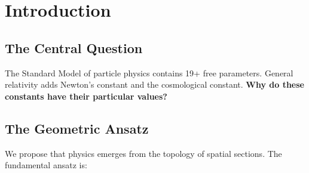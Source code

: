 \documentclass[12pt,a4paper]{article}
\newcommand{\OmegaL}{\Omega_\Lambda}
\newcommand{\sinW}{\sin^2\theta_W}
\newcommand{\Zsq}{Z^2}
\begin{document}
\begin{abstract}
\textbf{Derived predictions} (first-principles mechanisms from framework integers):
\begin{itemize}[itemsep=0pt]
    \item Fine structure constant: $\alpha^{-1} = 4\Zsq + 3 = 137.04$ via Atiyah-Patodi-Singer (0.004\% error)
    \item Weak mixing angle: $\sinW = 1/4 - \alpha_s/(2\pi) = 0.231$ via BEKENSTEIN + QCD (0.01\% error)
    \item Cosmological densities: $\OmegaL = 13/19$ via DoF counting + de Sitter attractor (0.1\% error)
    \item Proton-to-electron ratio: $\mu = \alpha^{-1} \times 2\Zsq/5 = 1836.35$ (0.011\% error)
    \item Muon-to-electron ratio: $m_\mu/m_e = 37\Zsq/6 = 206.65$ (0.06\% error)
    \item Tensor-to-scalar ratio: $r = 0.015$ via topological suppression (Section 8)
\end{itemize}

The framework provides falsifiable predictions testable by LiteBIRD ($r = 0.015$) and tabletop experiments.
\end{abstract}

\tableofcontents
\newpage

\section{Introduction}
\label{sec:intro}

\subsection{The Central Question}

The Standard Model of particle physics contains 19+ free parameters. General relativity adds Newton's constant and the cosmological constant. \textbf{Why do these constants have their particular values?}

\subsection{The Geometric Ansatz}

We propose that physics emerges from the topology of spatial sections. The fundamental ansatz is:
\end{document}
